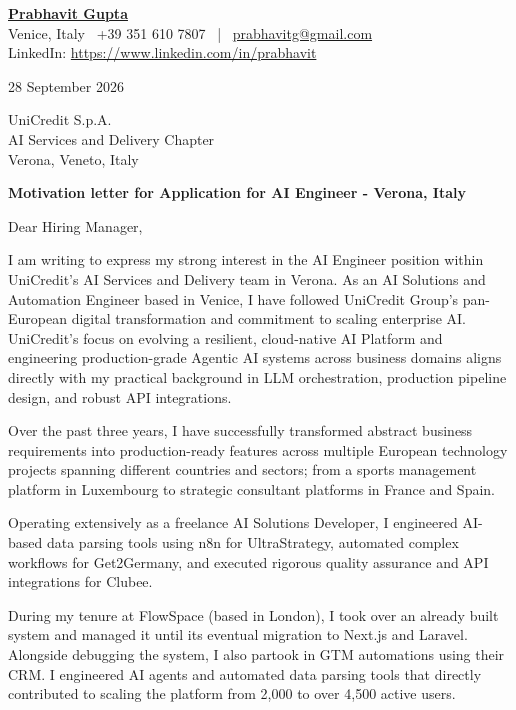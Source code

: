 \documentclass[10pt,a4paper]{article}
\begin{document}

\textbf{\underline{Prabhavit Gupta}}\\
Venice, Italy \ +39 351 610 7807 \ | \ \href{mailto:prabhavitg@gmail.com}{prabhavitg@gmail.com}\\
LinkedIn: \href{https://www.linkedin.com/in/prabhavit}{https://www.linkedin.com/in/prabhavit}

\vspace{0.8em}
28 September 2026

\vspace{0.8em}
UniCredit S.p.A.\\
AI Services and Delivery Chapter\\
Verona, Veneto, Italy

\vspace{0.8em}
\textbf{Motivation letter for Application for AI Engineer - Verona, Italy}

\vspace{0.8em}
Dear Hiring Manager,

I am writing to express my strong interest in the AI Engineer position within UniCredit's AI Services and Delivery team in Verona. As an AI Solutions and Automation Engineer based in Venice, I have followed UniCredit Group's pan-European digital transformation and commitment to scaling enterprise AI. UniCredit's focus on evolving a resilient, cloud-native AI Platform and engineering production-grade Agentic AI systems across business domains aligns directly with my practical background in LLM orchestration, production pipeline design, and robust API integrations.

Over the past three years, I have successfully transformed abstract business requirements into production-ready features across multiple European technology projects spanning different countries and sectors; from a sports management platform in Luxembourg to strategic consultant platforms in France and Spain.

Operating extensively as a freelance AI Solutions Developer, I engineered AI-based data parsing tools using n8n for UltraStrategy, automated complex workflows for Get2Germany, and executed rigorous quality assurance and API integrations for Clubee.

During my tenure at FlowSpace (based in London), I took over an already built system and managed it until its eventual migration to Next.js and Laravel. Alongside debugging the system, I also partook in GTM automations using their CRM. I engineered AI agents and automated data parsing tools that directly contributed to scaling the platform from 2,000 to over 4,500 active users.
\end{document}
